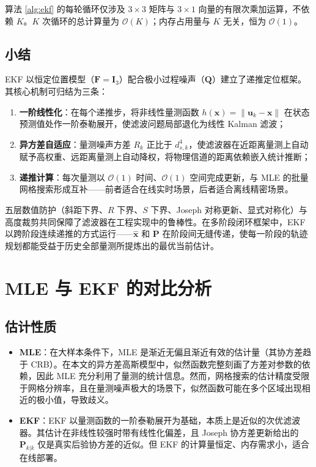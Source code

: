 算法 \ref{alg:ekf} 的每轮循环仅涉及 $3 \times 3$ 矩阵与 $3 \times 1$ 向量的有限次乘加运算，不依赖 $K$。$K$ 次循环的总计算量为 $\mathcal{O}(K)$；内存占用量与 $K$ 无关，恒为 $\mathcal{O}(1)$。

\subsection{小结}

EKF 以恒定位置模型（$\mathbf{F} = \mathbf{I}_3$）配合极小过程噪声（$\mathbf{Q}$）建立了递推定位框架。其核心机制可归结为三条：

\begin{enumerate}
    \item \textbf{一阶线性化}：在每个递推步，将非线性量测函数 $h(\mathbf{x}) = \|\mathbf{u}_k - \mathbf{x}\|$ 在状态预测值处作一阶泰勒展开，使滤波问题局部退化为线性 Kalman 滤波；
    \item \textbf{异方差自适应}：量测噪声方差 $R_k$ 正比于 $d_{s,k}^4$，使滤波器在近距离量测上自动赋予高权重、远距离量测上自动降权，将物理信道的距离依赖嵌入统计推断；
    \item \textbf{递推计算}：每次量测以 $\mathcal{O}(1)$ 时间、$\mathcal{O}(1)$ 空间完成更新，与 MLE 的批量网格搜索形成互补——前者适合在线实时场景，后者适合离线精密场景。
\end{enumerate}

五层数值防护（斜距下界、$R$ 下界、$S$ 下界、Joseph 对称更新、显式对称化）与高度裁剪共同保障了滤波器在工程实现中的鲁棒性。在多阶段闭环框架中，EKF 以跨阶段连续递推的方式运行——$\hat{\mathbf{x}}$ 和 $\mathbf{P}$ 在阶段间无缝传递，使每一阶段的轨迹规划都能受益于历史全部量测所提炼出的最优当前估计。


\section{MLE 与 EKF 的对比分析}
\label{sec:comparison}

\subsection{估计性质}

\begin{itemize}
    \item \textbf{MLE}：在大样本条件下，MLE 是渐近无偏且渐近有效的估计量（其协方差趋于 CRB）。在本文的异方差高斯模型中，似然函数完整刻画了方差对参数的依赖，因此 MLE 充分利用了量测的统计信息。然而，网格搜索的估计精度受限于网格分辨率，且在量测噪声极大的场景下，似然函数可能在多个区域出现相近的极小值，导致歧义。
    \item \textbf{EKF}：EKF 以量测函数的一阶泰勒展开为基础，本质上是近似的次优滤波器。其估计在非线性较强时带有线性化偏差，且 Joseph 协方差更新给出的 $\mathbf{P}_{k|k}$ 仅是真实后验协方差的近似。但 EKF 的计算量恒定、内存需求小，适合在线部署。
\end{itemize}

